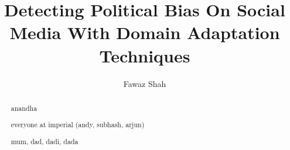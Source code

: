 \documentclass[a4paper, twoside]{report}
\title{Detecting Political Bias On Social Media With Domain Adaptation Techniques}
\author{Fawaz Shah}
\begin{document}


\begin{abstract}

\end{abstract}

\renewcommand{\abstractname}{Acknowledgements}
\begin{abstract}
anandha

everyone at imperial (andy, subhash, arjun)

mum, dad, dadi, dada
\end{abstract}

\tableofcontents
\listoffigures
\listoftables









\end{document}
